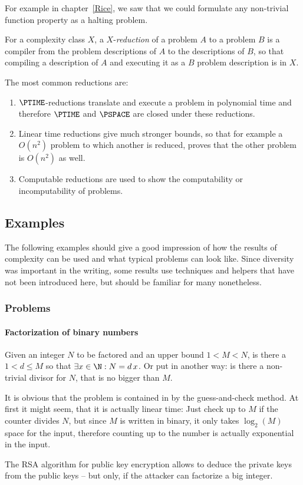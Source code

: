 For example in chapter~\ref{Rice}, we saw that we could formulate any 
non-trivial function property as a halting problem.

\begin{defn}
	For a complexity class $X$, a $X$-\emph{reduction} of a problem $A$ to a
	problem $B$ is a compiler from the problem descriptions of $A$ to the 
	descriptions of $B$, so that compiling a description of $A$ and executing 
	it as a $B$ problem description is in $X$.
\end{defn}

\begin{example}
	The most common reductions are:
	\begin{enumerate}
		\item $\PTIME$-reductions translate and execute a problem in polynomial 
			time and therefore $\PTIME$ and $\PSPACE$ are closed under these reductions.
		\item Linear time reductions give much stronger bounds, so that for example
			a $O(n^2)$ problem to which another is reduced, proves that the other 
			problem is $O(n^2)$ as well.
		\item Computable reductions are used to show the computability or 
			incomputability of problems.
	\end{enumerate}
\end{example}

\subsection{Examples}
The following examples should give a good impression of how the results of 
complexity can be used and what typical problems can look like. Since 
diversity was important in the writing, some results use techniques and 
helpers that have not been introduced here, but should be familiar for many nonetheless.
\subsubsection{Problems}
\paragraph{Factorization of binary numbers}
Given an integer $N$ to be factored and an upper bound $1<M<N$, is there a 
$1<d\leq M$ so that $\exists x\in \N: N = d\,x$. Or put in another way: is 
there a non-trivial divisor for $N$, that is no bigger than $M$.

It is obvious that the problem is contained in \NPTIME by the guess-and-check 
method. At first it might seem, that it is actually linear time: Just check 
up to $M$ if the counter divides $N$, but since $M$ is written in binary, it 
only takes $\log_2(M)$ space for the input, therefore counting up to the 
number is actually exponential in the input.
\begin{example}[Relevance] 
	The RSA algorithm for public key encryption allows to deduce the private keys
	from the public keys -- but only, if the attacker can factorize a big
	integer.
\end{example}

